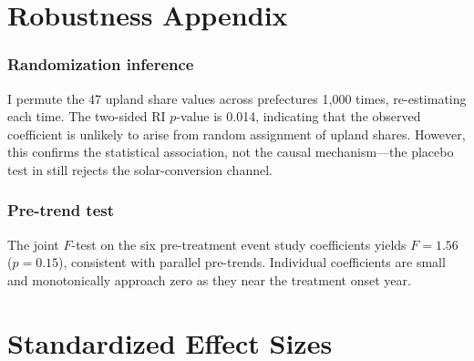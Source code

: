 \documentclass[12pt]{article}
\begin{document}
\section{Robustness Appendix}

\subsubsection*{Randomization inference} I permute the 47 upland share values across prefectures 1,000 times, re-estimating  each time. The two-sided RI $p$-value is 0.014, indicating that the observed coefficient is unlikely to arise from random assignment of upland shares. However, this confirms the statistical association, not the causal mechanism---the placebo test in  still rejects the solar-conversion channel.

\subsubsection*{Pre-trend test} The joint $F$-test on the six pre-treatment event study coefficients yields $F = 1.56$ ($p = 0.15$), consistent with parallel pre-trends. Individual coefficients are small and monotonically approach zero as they near the treatment onset year.

\section{Standardized Effect Sizes}
\label{sec:sde}


\end{document}

